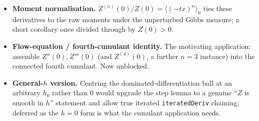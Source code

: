 \documentclass[11pt]{article}
\begin{document}
\begin{itemize}[itemsep=3pt]
\item \textbf{Moment normalisation.} $Z^{(n)}(0)/Z(0) = \langle(-tx)^n\rangle_0$
  ties these derivatives to the raw moments under the unperturbed Gibbs
  measure; a short corollary once divided through by $Z(0)>0$.
\item \textbf{Flow-equation / fourth-cumulant identity.} The motivating
  application: assemble $Z''(0), Z'''(0)$ (and $Z^{(4)}(0)$, a further $n=3$
  instance) into the connected fourth cumulant. Now unblocked.
\item \textbf{General-$h$ version.} Centring the dominated-differentiation
  ball at an arbitrary $h_0$ rather than $0$ would upgrade the step lemma to
  a genuine ``$Z$ is smooth in $h$'' statement and allow true iterated
  \texttt{iteratedDeriv} chaining; deferred as the $h=0$ form is what the
  cumulant application needs.
\end{itemize}
\end{document}
